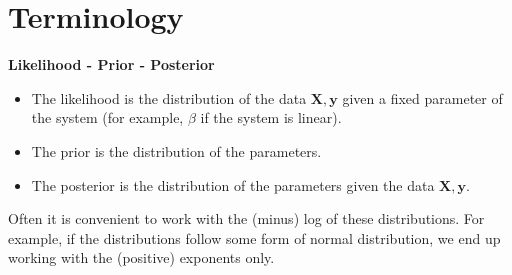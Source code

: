 \documentclass[11pt]{article}
\theoremstyle{definition}
\newcommand{\XX}{\mathbf{X}}
\newcommand{\yy}{\mathbf{y}}
\begin{document}
\section{Terminology}
\begin{shaded}
	\textbf{Likelihood - Prior - Posterior}
	\begin{itemize}
		\item The likelihood is the distribution of the data $\XX,\yy$ given a
		fixed parameter of the system (for example, $\beta$ if the system is linear).
		\item The prior is the distribution of the parameters.
		\item The posterior is the distribution of the parameters given the data $\XX,\yy$.
	\end{itemize}
\end{shaded}
Often it is convenient to work with the (minus) log of these distributions. For
example, if the distributions follow some form of normal distribution, we end up
working with the (positive) exponents only.
\end{document}

